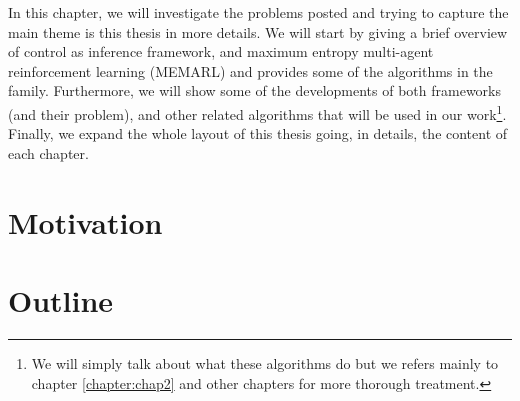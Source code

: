\label{chapter:intro}
\begin{miniabstract}
    In this chapter, we will investigate the problems posted and trying to capture the main theme is this thesis in more details. We will start by giving a brief overview of control as inference framework, and maximum entropy multi-agent reinforcement learning (MEMARL) and provides some of the algorithms in the family. Furthermore, we will show some of the developments of both frameworks (and their problem), and other related algorithms that will be used in our work\footnote{We will simply talk about what these algorithms do but we refers mainly to chapter \ref{chapter:chap2} and other chapters for more thorough treatment.}. Finally, we expand the whole layout of this thesis going, in details, the content of each chapter.  
\end{miniabstract}

\section{Motivation}


\section{Outline}
